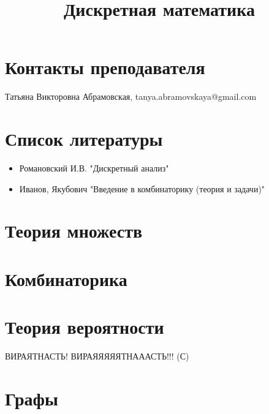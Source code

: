 \documentclass[12pt,cmcyralt]{article}
\begin{document}
\title{Дискретная математика}
\maketitle
\tableofcontents
\section{Контакты преподавателя}
Татьяна Викторовна Абрамовская, tanya.abramovskaya@gmail.com
\section{Список литературы}
\begin{itemize}
\item Романовский И.В. "Дискретный анализ"
\item Иванов, Якубович "Введение в комбинаторику (теория и задачи)"
\end{itemize}
\section{Теория множеств}





\section{Комбинаторика}




\section{Теория вероятности}
ВИРАЯТНАСТЬ! ВИРАЯЯЯЯЯТНАААСТЬ!!! (С)












\section{Графы}





\end{document}
